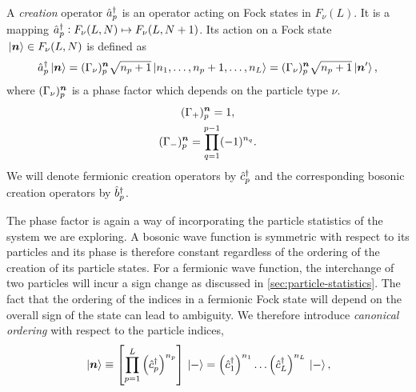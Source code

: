             \begin{definition}
                \label{def:creation_1}
                A \emph{creation} operator $\hat{a}_{p}^{\dagger}$ is an operator acting on
                Fock states in $F_{\nu}(L)$.
                It is a mapping $\hat{a}_{p}^{\dagger}: F_{\nu}(L, N) \mapsto F_{\nu}(L, N +
                1)$.
                Its action on a Fock state $\ket*{\boldsymbol{n}} \in F_{\nu}(L, N)$ is
                defined as
                \begin{align}
                    \hat{a}_{p}^{\dagger}\ket*{\boldsymbol{n}}
                    = (\Gamma_{\nu})^{\boldsymbol{n}}_{p}
                    \sqrt{n_p + 1}
                    \ket*{n_1, \dots, n_p + 1, \dots, n_L}
                    = (\Gamma_{\nu})^{\boldsymbol{n}}_{p}
                    \sqrt{n_p + 1}
                    \ket*{\boldsymbol{n}'},
                    \label{eq:general_creation}
                \end{align}
                where $(\Gamma_{\nu})^{\boldsymbol{n}}_{p}$ is a phase factor which
                depends on the particle type $\nu$.
                \begin{gather}
                    (\Gamma_{+})^{\boldsymbol{n}}_{p} = 1, \\
                    (\Gamma_{-})^{\boldsymbol{n}}_{p}
                    = \prod_{q = 1}^{p - 1} (-1)^{n_q}.
                    \label{eq:phase-fermion}
                \end{gather}
                We will denote fermionic creation operators by $\hat{c}_{p}^{\dagger}$ and the
                corresponding bosonic creation operators by $\hat{b}_{p}^{\dagger}$.
            \end{definition}
            The phase factor is again a way of incorporating the particle
            statistics of the system we are exploring.
            A bosonic wave function is symmetric with respect to its particles
            and its phase is therefore constant regardless of the ordering of the
            creation of its particle states.
            For a fermionic wave function, the interchange of two particles will
            incur a sign change as discussed in
            \autoref{sec:particle-statistics}.
            The fact that the ordering of the indices in a fermionic Fock state
            will depend on the overall sign of the state can lead to ambiguity.
            We therefore introduce \emph{canonical ordering} with respect to the
            particle indices,
            \begin{align}
                \ket*{\boldsymbol{n}}
                \equiv \left[ 
                    \prod_{p = 1}^{L}
                    \left( \hat{c}_{p}^{\dagger} \right)^{n_p}
                 \right]\ket*{-}
                = \left( \hat{c}_{1}^{\dagger} \right)^{n_1}\dots\left( \hat{c}_{L}^{\dagger} \right)^{n_L}\ket*{-},
                \label{eq:canonical-fock-state}
            \end{align}
